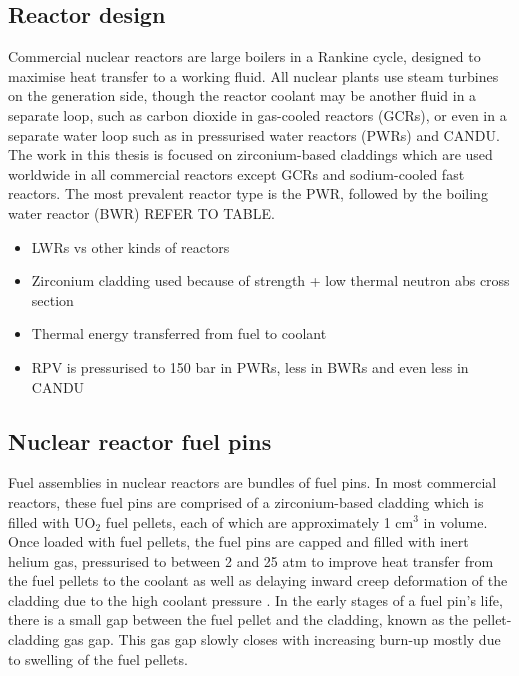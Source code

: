 \subsection{Reactor design}

Commercial nuclear reactors are large boilers in a Rankine cycle, designed to maximise heat transfer to a working fluid. All nuclear plants use steam turbines on the generation side, though the reactor coolant may be another fluid in a separate loop, such as carbon dioxide in gas-cooled reactors (GCRs), or even in a separate water loop such as in pressurised water reactors (PWRs) and CANDU. The work in this thesis is focused on zirconium-based claddings which are used worldwide in all commercial reactors except GCRs and sodium-cooled fast reactors. The most prevalent reactor type is the PWR, followed by the boiling water reactor (BWR) {REFER TO TABLE}. 



\begin{itemize}
\item LWRs vs other kinds of reactors
\item Zirconium cladding used because of strength + low thermal neutron abs cross section
\item Thermal energy transferred from fuel to coolant
\item RPV is pressurised to 150 bar in PWRs, less in BWRs and even less in CANDU
\end{itemize}

\subsection{Nuclear reactor fuel pins}

Fuel assemblies in nuclear reactors are bundles of fuel pins. In most commercial reactors, these fuel pins are comprised of a zirconium-based cladding which is filled with UO$_{2}$ fuel pellets, each of which are approximately 1 cm$^{3}$ in volume. Once loaded with fuel pellets, the fuel pins are capped and filled with inert helium gas, pressurised to between 2 and 25 atm to improve heat transfer from the fuel pellets to the coolant as well as delaying inward creep deformation of the cladding due to the high coolant pressure \cite{King1980}. In the early stages of a fuel pin's life, there is a small gap between the fuel pellet and the cladding, known as the pellet-cladding gas gap. This gas gap slowly closes with increasing burn-up mostly due to swelling of the fuel pellets.

